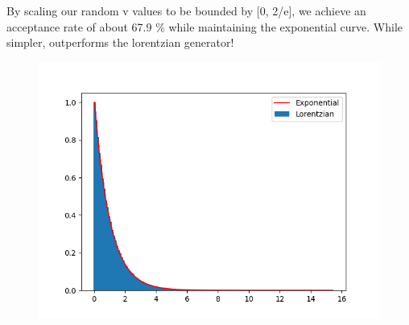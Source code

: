 \documentclass[]{article}
\begin{document}
By scaling our random v values to be bounded by [0, 2/e], we achieve an acceptance rate of about 67.9 \% while maintaining the exponential curve. While simpler, outperforms the lorentzian generator!

\begin{figure}[h!]
	\centering
	\includegraphics[width=0.45\linewidth]{Results/q3.png}
\end{figure}
\end{document}
